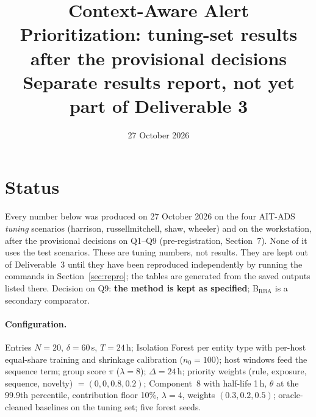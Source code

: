 \documentclass[10.5pt,a4paper]{article}
\title{\textbf{Context-Aware Alert Prioritization: tuning-set results after the provisional decisions}\\[2pt]\large Separate results report, not yet part of Deliverable 3}
\date{27 October 2026}
\author{}
\begin{document}
\maketitle
\vspace{-2.5em}

\section*{Status}
Every number below was produced on 27 October 2026 on the four AIT-ADS \emph{tuning} scenarios (harrison, russellmitchell, shaw, wheeler) and on the workstation, after the provisional decisions on Q1--Q9 (pre-registration, Section~7). None of it uses the test scenarios. These are tuning numbers, not results. They are kept out of Deliverable~3 until they have been reproduced independently by running the commands in Section~\ref{sec:repro}; the tables are generated from the saved outputs listed there. Decision on Q9: \textbf{the method is kept as specified}; B$_\mathrm{RBA}$ is a secondary comparator.

\paragraph{Configuration.} Entries $N = 20$, $\delta = 60$\,s, $T = 24$\,h; Isolation Forest per entity type with per-host equal-share training and shrinkage calibration ($n_0 = 100$); host windows feed the sequence term; group score $\pi$ ($\lambda = 8$); $\Delta = 24$\,h; priority weights (rule, exposure, sequence, novelty) $= (0, 0, 0.8, 0.2)$; Component~8 with half-life 1\,h, $\theta$ at the 99.9th percentile, contribution floor 10\%, $\lambda = 4$, weights $(0.3, 0.2, 0.5)$; oracle-cleaned baselines on the tuning set; five forest seeds.
\end{document}
